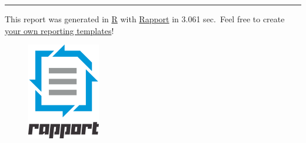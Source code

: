 \documentclass[]{article}
\makeatletter
\def\maxwidth{\ifdim\Gin@nat@width>\linewidth\linewidth
\else\Gin@nat@width\fi}
\let\Oldincludegraphics\includegraphics
\renewcommand{\includegraphics}[1]{\Oldincludegraphics[width=\maxwidth]{#1}}
\makeatother
\begin{document}
\begin{center}\rule{3in}{0.4pt}\end{center}

This report was generated in \href{http://www.r-project.org/}{R} with
\href{http://al3xa.github.com/rapport/}{Rapport} in 3.061 sec.~Feel free
to create \href{http://al3xa.github.com/rapport/#custom}{your own
reporting templates}!

\begin{figure}[htbp]
\centering
\includegraphics{images/rapport.png}
\caption{}
\end{figure}
\end{document}
